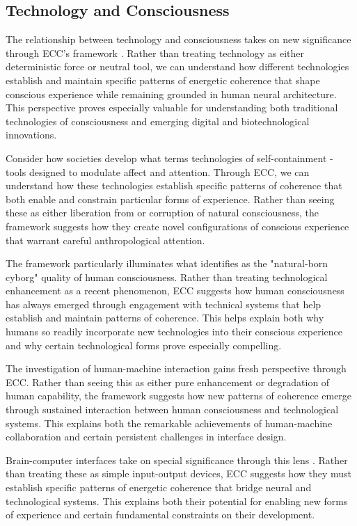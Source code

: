 \begin{refsection}
\subsection{Technology and Consciousness}

The relationship between technology and consciousness takes on new significance through ECC's framework \cite{hayles2012how}. Rather than treating technology as either deterministic force or neutral tool, we can understand how different technologies establish and maintain specific patterns of energetic coherence that shape conscious experience while remaining grounded in human neural architecture. This perspective proves especially valuable for understanding both traditional technologies of consciousness and emerging digital and biotechnological innovations.

Consider how societies develop what \cite{turkle2011alone} terms technologies of self-containment - tools designed to modulate affect and attention. Through ECC, we can understand how these technologies establish specific patterns of coherence that both enable and constrain particular forms of experience. Rather than seeing these as either liberation from or corruption of natural consciousness, the framework suggests how they create novel configurations of conscious experience that warrant careful anthropological attention.

The framework particularly illuminates what \cite{clark2003natural} identifies as the "natural-born cyborg" quality of human consciousness. Rather than treating technological enhancement as a recent phenomenon, ECC suggests how human consciousness has always emerged through engagement with technical systems that help establish and maintain patterns of coherence. This helps explain both why humans so readily incorporate new technologies into their conscious experience and why certain technological forms prove especially compelling.

The investigation of human-machine interaction \cite{mindell2015our} gains fresh perspective through ECC. Rather than seeing this as either pure enhancement or degradation of human capability, the framework suggests how new patterns of coherence emerge through sustained interaction between human consciousness and technological systems. This explains both the remarkable achievements of human-machine collaboration and certain persistent challenges in interface design.

Brain-computer interfaces take on special significance through this lens \cite{clark2003natural}. Rather than treating these as simple input-output devices, ECC suggests how they must establish specific patterns of energetic coherence that bridge neural and technological systems. This explains both their potential for enabling new forms of experience and certain fundamental constraints on their development.


\end{refsection}
